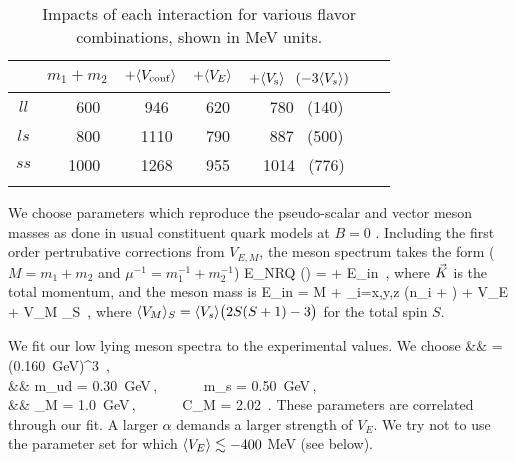 \begin{table}[tb]
\caption{Impacts of each interaction for various flavor combinations, shown in MeV units.}
\label{tab:interaction}       %
\begin{tabular}{c lc lc lc |}
\hline\noalign{\smallskip}
& $m_1+m_2$ & $+\langle V_{\rm conf}\rangle $   & $+\langle V_{E} \rangle $  & $+\langle V_{\rm s} \rangle  $~$(-3\langle V_s \rangle)$  \\
\hline\noalign{\smallskip}
$ll$   &~~~ 600   &~ 946     &~ 620 &~ 780~  (140)\\
$ls$  &~~~ 800   &~ 1110   &~ 790 &~  887~  (500)\\
$ss$ &~~ 1000 &~ 1268   &~ 955 &\,  1014~ (776)\\
\hline\noalign{\smallskip}
\end{tabular}
\vspace*{0.1cm}  %
\end{table}

We choose parameters which reproduce the pseudo-scalar and vector meson masses as done in usual constituent quark models at $B=0$ \cite{DeRujula:1975qlm,Isgur:1979be}.
Including the first order pertrubative corrections from $V_{E,M}$, the meson spectrum takes the form ($M=m_1+m_2$ and $\mu^{-1} = m_1^{-1} + m_2^{-1}$)
%
\beq
E_{\rm NRQ} (\vK) =  + E_{\rm in} \,,
\label{eq:E_NRQ_B0}
\eeq
%
where $\vec{K}$ is the total momentum, and the meson mass is 
%
\beq
E_{\rm in} = M + \!\! \sum_{i=x,y,z} \big(n_i + \big)  \sqrt{ \frac{\, 2\alpha \,}{\, \mu \,}   \,} + \la V_E \ra + \la V_M \ra_S \,,
\label{eq:meson_B0}
\eeq
% 
where $\langle V_M \rangle_{S} = \langle V_s \rangle \big( 2S(S+1)-3 \big)$ for the total spin $S$.


We fit our low lying meson spectra to the experimental values.
We choose
%
\beq
&& \alpha = (0.160\, {\rm GeV})^3 \,, \nonumber \\
&& m_{ud} = 0.30\, {\rm GeV}\,,~~~~~~ m_s = 0.50\, {\rm GeV}\,, \nonumber \\
&& \Lambda_M = 1.0\, {\rm GeV}\,,~~~~~~ C_M = 2.02 \,.
\eeq
%
These parameters are correlated through our fit. 
A larger $\alpha$ demands a larger strength of $V_E$.
We try not to use the parameter set for which $\langle V_E \rangle \lesssim -400$ MeV (see below).

